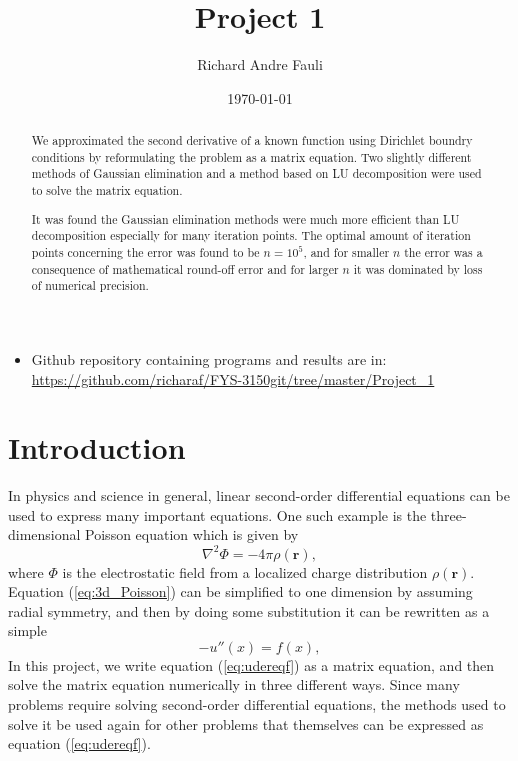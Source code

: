 \documentclass[norsk,a4paper,12pt]{article}
\title{Project 1}
\author{Richard Andre Fauli}
\date{\today}
\begin{document}
\maketitle

\begin{abstract}
We approximated the second derivative of a known function using Dirichlet boundry conditions by reformulating the problem as a matrix equation. Two slightly different methods of Gaussian elimination and a method based on LU decomposition were used to solve the matrix equation. 

It was found the Gaussian elimination methods were much more efficient than LU decomposition especially for many iteration points. The optimal amount of iteration points concerning the error was found to be $n=10^5$, and for smaller $n$ the error was a consequence of mathematical round-off error and for larger $n$ it was dominated by loss of numerical precision.
\end{abstract}
\begin{itemize}
\item Github repository containing programs and results are in: \url{https://github.com/richaraf/FYS-3150git/tree/master/Project_1}
\end{itemize}
\section{Introduction}
In physics and science in general, linear second-order differential equations can be used to express many important equations. One such example is the three-dimensional Poisson equation which is given by
\begin{equation}
\nabla ^2 \Phi = - 4\pi \rho (\textbf{r}),
\label{eq:3d_Poisson}
\end{equation}
where $\Phi$ is the electrostatic field from a localized charge distribution $\rho(\textbf{r})$. Equation (\ref{eq:3d_Poisson}) can be simplified to one dimension by assuming radial symmetry, and then by doing some substitution it can be rewritten as a simple
\begin{equation}
-u''(x) = f(x),
\label{eq:udereqf}
\end{equation}
In this project, we write equation (\ref{eq:udereqf}) as a matrix equation, and then solve the matrix equation numerically in three different ways. Since many problems require solving second-order differential equations, the methods used to solve it be used again for other problems that themselves can be expressed as equation (\ref{eq:udereqf}).
\end{document}
